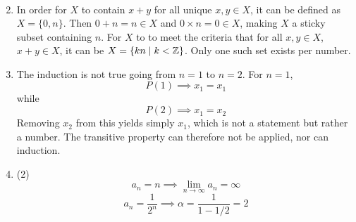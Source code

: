 \documentclass[../MATH145.tex]{subfiles}
\begin{document}
\begin{enumerate}
\begin{tasks}
\begin{align*}
						\end{align*}
				\end{tasks}
			\item
				\begin{tasks}
					\task
						In order for \(X\) to contain \(x + y\) for all unique \(x, y \in X\), it can be defined as \(X = \{0, n\}\). Then \(0 + n = n \in X\) and \(0 \times n = 0 \in X\), making \(X\) a sticky subset containing \(n\).
					\task
						For \(X\) to to meet the criteria that for all \(x, y \in X\), \(x + y \in X\), it can be \(X = \{kn \mid k < \mathbb{Z}\}\). Only one such set exists per number.
				\end{tasks}
			\item
				The induction is not true going from \(n = 1\) to \(n = 2\). For \(n = 1\),
					\[P(1) \implies x_1 = x_1\]
					while
					\[P(2) \implies x_1 = x_2\]
					Removing \(x_2\) from this yields simply \(x_1\), which is not a statement but rather a number. The transitive property can therefore not be applied, nor can induction.
			\item
				\begin{tasks}(2)
					\task
						\[
							a_n = n
								\implies \lim_{n \to \infty} a_n = \infty
						\]
					\task
						\[
							a_n = \frac{1}{2^n} 
								\implies \alpha = \frac{1}{1 - 1/2} = 2
						\]
				\end{tasks}
		\end{enumerate}
\end{document}
